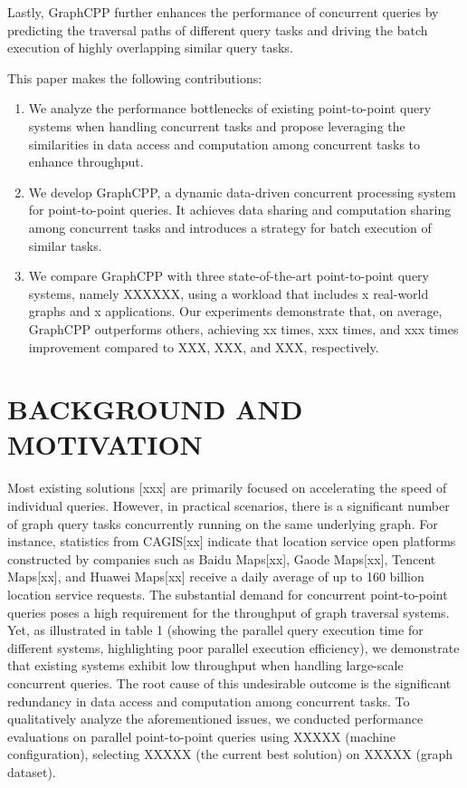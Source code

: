 \documentclass[lettersize,journal]{IEEEtran} %
\begin{document}
Lastly, GraphCPP further enhances the performance of concurrent queries by predicting the traversal paths of different query tasks and driving the batch execution of highly overlapping similar query tasks.

This paper makes the following contributions:
\begin{enumerate}
  \item{We analyze the performance bottlenecks of existing point-to-point query systems when handling concurrent tasks and propose leveraging the similarities in data access and computation among concurrent tasks to enhance throughput.}
  \item{We develop GraphCPP, a dynamic data-driven concurrent processing system for point-to-point queries. It achieves data sharing and computation sharing among concurrent tasks and introduces a strategy for batch execution of similar tasks.}
  \item{We compare GraphCPP with three state-of-the-art point-to-point query systems, namely XXXXXX, using a workload that includes x real-world graphs and x applications. Our experiments demonstrate that, on average, GraphCPP outperforms others, achieving xx times, xxx times, and xxx times improvement compared to XXX, XXX, and XXX, respectively.}
\end{enumerate}

\section{BACKGROUND AND MOTIVATION}
Most existing solutions [xxx] are primarily focused on accelerating the speed of individual queries. However, in practical scenarios, there is a significant number of graph query tasks concurrently running on the same underlying graph. For instance, statistics from CAGIS[xx] indicate that location service open platforms constructed by companies such as Baidu Maps[xx], Gaode Maps[xx], Tencent Maps[xx], and Huawei Maps[xx] receive a daily average of up to 160 billion location service requests. The substantial demand for concurrent point-to-point queries poses a high requirement for the throughput of graph traversal systems. Yet, as illustrated in table 1 (showing the parallel query execution time for different systems, highlighting poor parallel execution efficiency), we demonstrate that existing systems exhibit low throughput when handling large-scale concurrent queries. The root cause of this undesirable outcome is the significant redundancy in data access and computation among concurrent tasks. To qualitatively analyze the aforementioned issues, we conducted performance evaluations on parallel point-to-point queries using XXXXX (machine configuration), selecting XXXXX (the current best solution) on XXXXX (graph dataset).
\end{document}
